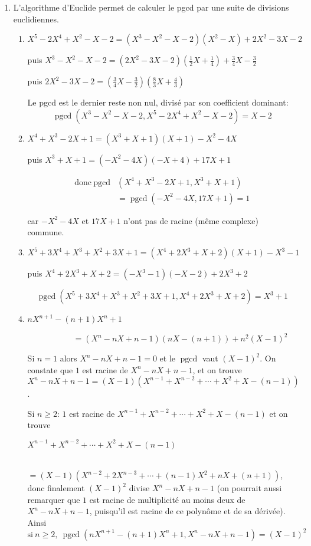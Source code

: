 \documentclass[11pt,a4paper]{article}
\renewcommand{\ge}{\geqslant} \renewcommand{\geq}{\geqslant}
\newcommand{\pgcd}{\mathop{\mathrm{pgcd}}\nolimits}
\begin{document}
\begin{enumerate}
\item L'algorithme d'Euclide permet de calculer le pgcd par 
une suite de divisions euclidiennes.

\begin{enumerate}
\item $X^5-2X^4+X^2-X-2=(X^3-X^2-X-2)(X^2-X)+2X^2-3X-2$ 

puis $X^3-X^2-X-2=(2X^2-3X-2)(\frac{1}{2}X+\frac{1}{4})+\frac{3}{4}X-\frac{3}{2}$ 

puis $2X^2-3X-2=(\frac{3}{4}X-\frac{3}{2})(\frac{8}{3}X+\frac{4}{3})$


Le pgcd est le dernier reste non nul, 
divisé par son coefficient dominant: 
$$\pgcd(X^3-X^2-X-2,X^5-2X^4+X^2-X-2)=X-2$$


\item $X^4+X^3-2X+1=(X^3+X+1)(X+1)-X^2-4X$

puis $X^3+X+1=(-X^2-4X)(-X+4)+17X+1$

$$\begin{array}{rl}\text{donc}\ \pgcd&(X^4+X^3-2X+1,X^3+X+1)\\
&=\pgcd(-X^2-4X,17X+1)=1\end{array}$$

car $-X^2-4X$ et $17X+1$ n'ont pas de racine (même complexe) commune.


\item $X^5+3X^4+X^3+X^2+3X+1=(X^4+2X^3+X+2)(X+1)-X^3-1$

puis $X^4+2X^3+X+2=(-X^3-1)(-X-2)+2X^3+2$

$$\pgcd(X^5+3X^4+X^3+X^2+3X+1,X^4+2X^3+X+2)=X^3+1$$


\item $nX^{n+1}-(n+1)X^n+1$

\ \ \ \ \ \ \ \ \ \ \ $=(X^n-nX+n-1)(nX-(n+1))+n^2(X-1)^2$ 

Si $n=1$ alors $X^n-nX+n-1=0$ et le $\pgcd$ vaut $(X-1)^2$.
On constate que $1$ est racine de $X^n-nX+n-1$, 
et on trouve $X^n-nX+n-1=(X-1)(X^{n-1}+X^{n-2}+\cdots+X^2+X-(n-1))$.

Si $n\ge 2$: $1$ est racine de $X^{n-1}+X^{n-2}+\cdots+X^2+X-(n-1)$ et on trouve 

$X^{n-1}+X^{n-2}+\cdots+X^2+X-(n-1)$

\ \ \ \ \ \ \ $=(X-1)(X^{n-2}+2X^{n-3}+\cdots+(n-1)X^2+nX+(n+1))$, donc finalement 
$(X-1)^2$ divise $X^n-nX+n-1$ (on pourrait aussi remarquer 
que $1$ est racine de multiplicité au moins deux de 
$X^n-nX+n-1$, puisqu'il est racine de ce polynôme et de sa dérivée). 
Ainsi 
$$\text{si}\ n\ge 2,\ \pgcd(nX^{n+1}-(n+1)X^n+1,X^n-nX+n-1)=(X-1)^2$$



\end{enumerate}
\end{enumerate}
\end{document}
